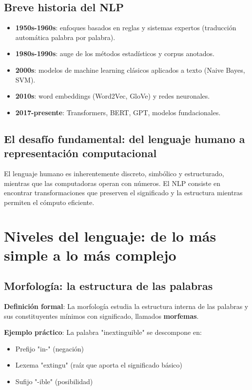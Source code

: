 \documentclass[12pt,a4paper,openany,oneside]{book}
\begin{document}
\subsection{Breve historia del NLP}
\begin{itemize}
    \item \textbf{1950s-1960s}: enfoques basados en reglas y sistemas expertos (traducción automática palabra por palabra).
    \item \textbf{1980s-1990s}: auge de los métodos estadísticos y corpus anotados.
    \item \textbf{2000s}: modelos de machine learning clásicos aplicados a texto (Naive Bayes, SVM).
    \item \textbf{2010s}: word embeddings (Word2Vec, GloVe) y redes neuronales.
    \item \textbf{2017-presente}: Transformers, BERT, GPT, modelos fundacionales.
\end{itemize}

\subsection{El desafío fundamental: del lenguaje humano a representación computacional}
El lenguaje humano es inherentemente discreto, simbólico y estructurado, mientras que las computadoras operan con números. El NLP consiste en encontrar transformaciones que preserven el significado y la estructura mientras permiten el cómputo eficiente.

\section{Niveles del lenguaje: de lo más simple a lo más complejo}

\subsection{Morfología: la estructura de las palabras}
\textbf{Definición formal}: La morfología estudia la estructura interna de las palabras y sus constituyentes mínimos con significado, llamados \textbf{morfemas}.

\textbf{Ejemplo práctico}: La palabra "inextinguible" se descompone en:
\begin{itemize}
    \item Prefijo "in-" (negación)
    \item Lexema "extingu" (raíz que aporta el significado básico)
    \item Sufijo "-ible" (posibilidad)
\end{itemize}
\end{document}
